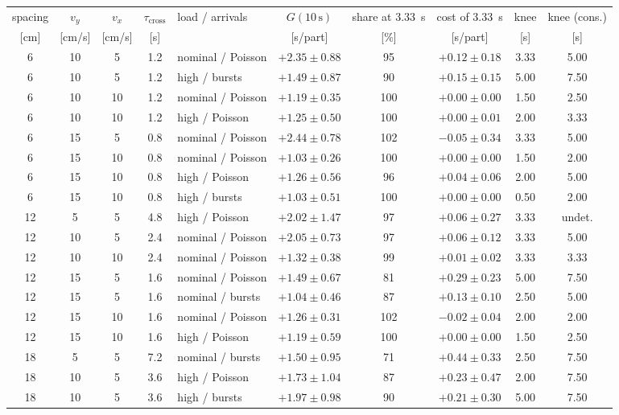 \begin{tabular}{@{}ccccl ccccc@{}}
\toprule
spacing & $v_y$ & $v_x$ & $\tau_{\mathrm{cross}}$ & load / arrivals & $G(10\,\mathrm{s})$ & share at 3.33~s & cost of 3.33~s & knee & knee (cons.) \\
{[cm]} & [cm/s] & [cm/s] & [s] & & [s/part] & [\%] & [s/part] & [s] & [s] \\
\midrule
6 & 10 & 5 & 1.2 & nominal / Poisson & $+2.35 \pm 0.88$ & 95 & $+0.12 \pm 0.18$ & 3.33 & 5.00 \\
6 & 10 & 5 & 1.2 & high / bursts & $+1.49 \pm 0.87$ & 90 & {\boldmath$+0.15 \pm 0.15$} & 5.00 & 7.50 \\
6 & 10 & 10 & 1.2 & nominal / Poisson & $+1.19 \pm 0.35$ & 100 & $+0.00 \pm 0.00$ & 1.50 & 2.50 \\
6 & 10 & 10 & 1.2 & high / Poisson & $+1.25 \pm 0.50$ & 100 & $+0.00 \pm 0.01$ & 2.00 & 3.33 \\
6 & 15 & 5 & 0.8 & nominal / Poisson & $+2.44 \pm 0.78$ & 102 & $-0.05 \pm 0.34$ & 3.33 & 5.00 \\
6 & 15 & 10 & 0.8 & nominal / Poisson & $+1.03 \pm 0.26$ & 100 & $+0.00 \pm 0.00$ & 1.50 & 2.00 \\
6 & 15 & 10 & 0.8 & high / Poisson & $+1.26 \pm 0.56$ & 96 & $+0.04 \pm 0.06$ & 2.00 & 5.00 \\
6 & 15 & 10 & 0.8 & high / bursts & $+1.03 \pm 0.51$ & 100 & {\boldmath$+0.00 \pm 0.00$} & 0.50 & 2.00 \\
12 & 5 & 5 & 4.8 & high / Poisson & $+2.02 \pm 1.47$ & 97 & $+0.06 \pm 0.27$ & 3.33 & undet. \\
12 & 10 & 5 & 2.4 & nominal / Poisson & $+2.05 \pm 0.73$ & 97 & $+0.06 \pm 0.12$ & 3.33 & 5.00 \\
12 & 10 & 10 & 2.4 & nominal / Poisson & $+1.32 \pm 0.38$ & 99 & $+0.01 \pm 0.02$ & 3.33 & 3.33 \\
12 & 15 & 5 & 1.6 & nominal / Poisson & $+1.49 \pm 0.67$ & 81 & {\boldmath$+0.29 \pm 0.23$} & 5.00 & 7.50 \\
12 & 15 & 5 & 1.6 & nominal / bursts & $+1.04 \pm 0.46$ & 87 & {\boldmath$+0.13 \pm 0.10$} & 2.50 & 5.00 \\
12 & 15 & 10 & 1.6 & nominal / Poisson & $+1.26 \pm 0.31$ & 102 & $-0.02 \pm 0.04$ & 2.00 & 2.00 \\
12 & 15 & 10 & 1.6 & high / Poisson & $+1.19 \pm 0.59$ & 100 & $+0.00 \pm 0.00$ & 1.50 & 2.50 \\
18 & 5 & 5 & 7.2 & nominal / bursts & $+1.50 \pm 0.95$ & 71 & {\boldmath$+0.44 \pm 0.33$} & 2.50 & 7.50 \\
18 & 10 & 5 & 3.6 & high / Poisson & $+1.73 \pm 1.04$ & 87 & $+0.23 \pm 0.47$ & 2.00 & 7.50 \\
18 & 10 & 5 & 3.6 & high / bursts & $+1.97 \pm 0.98$ & 90 & $+0.21 \pm 0.30$ & 5.00 & 7.50 \\
\bottomrule
\end{tabular}
